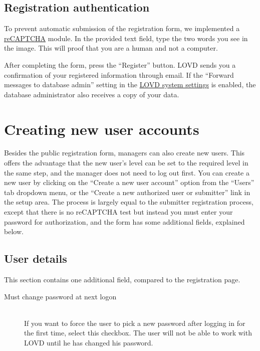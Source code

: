\documentclass[a4paper,oneside,openany,12pt]{memoir}
\renewenvironment{leftbar}[1][\hsize]
{%
    \def\FrameCommand
    {%
        {\color{LOVDdark}\vrule width 3pt \hspace{5pt}}%
        \colorbox{LOVDlight}%
    }%
    \MakeFramed{\hsize#1\advance\hsize-\width\FrameRestore}%
}
{\endMakeFramed}
\begin{document}
\subsection{Registration authentication}
To prevent automatic submission of the registration form, we implemented a \href{http://www.google.com/recaptcha}{reCAPTCHA} module.
In the provided text field, type the two words you see in the image.
This will proof that you are a human and not a computer.
\\
\par
After completing the form, press the ``Register'' button.
LOVD sends you a confirmation of your registered information through email.
If the ``Forward messages to database admin'' setting in the \hyperlink{s_system_settings}{LOVD system settings} is enabled,
 the database administrator also receives a copy of your data.





\section{Creating new user accounts}
Besides the public registration form, managers can also create new users.
This offers the advantage that the new user's level can be set to the required level in the same step, and the manager does not need to log out first.
You can create a new user by clicking on the ``Create a new user account'' option from the ``Users'' tab dropdown menu,
 or the ``Create a new authorized user or submitter'' link in the setup area.
The process is largely equal to the submitter registration process, except that there is no reCAPTCHA test but
 instead you must enter your password for authorization, and the form has some additional fields, explained below.



\subsection{User details}
This section contains one additional field, compared to the registration page.
\begin{description}
  \item[Must change password at next logon] \hfill \\
  If you want to force the user to pick a new password after logging in for the first time, select this checkbox.
  The user will not be able to work with LOVD until he has changed his password.
\end{description}
\end{document}
